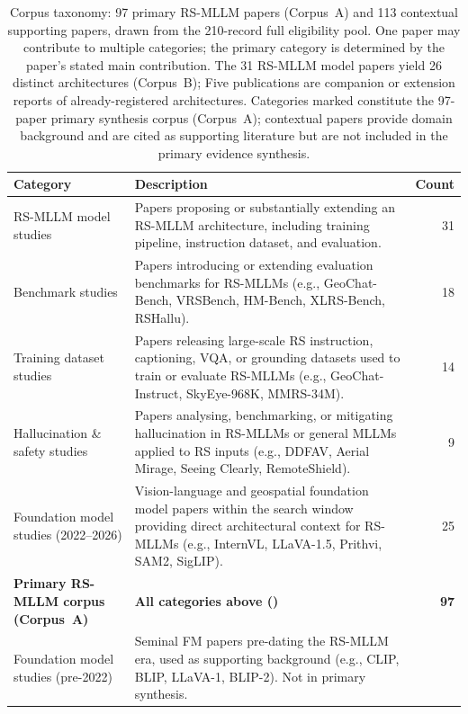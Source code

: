 \begin{table}[h]
\caption{Corpus taxonomy: 97 primary RS-MLLM papers (Corpus~A) and 113 contextual
supporting papers, drawn from the 210-record full eligibility pool.
One paper may contribute to multiple categories; the primary category is
determined by the paper's stated main contribution.
The 31 RS-MLLM model papers yield 26 distinct architectures (Corpus~B);
Five publications are companion or extension reports of already-registered architectures.
Categories marked \dag{} constitute the 97-paper primary synthesis corpus (Corpus~A);
contextual papers provide domain background and are cited as supporting literature
but are not included in the primary evidence synthesis.}\label{tab:corpus_taxonomy}
\small\setlength\tabcolsep{4pt}
\begin{tabular*}{\textwidth}{@{\extracolsep\fill}p{3.8cm}p{6.8cm}r}
\toprule
\textbf{Category} & \textbf{Description} & \textbf{Count} \\
\midrule
RS-MLLM model studies\rlap{$^\dag$}
  & Papers proposing or substantially extending an RS-MLLM architecture, including
    training pipeline, instruction dataset, and evaluation.
  & 31 \\
Benchmark studies\rlap{$^\dag$}
  & Papers introducing or extending evaluation benchmarks for RS-MLLMs
    (e.g., GeoChat-Bench, VRSBench, HM-Bench, XLRS-Bench, RSHallu).
  & 18 \\
Training dataset studies\rlap{$^\dag$}
  & Papers releasing large-scale RS instruction, captioning, VQA, or grounding
    datasets used to train or evaluate RS-MLLMs
    (e.g., GeoChat-Instruct, SkyEye-968K, MMRS-34M).
  & 14 \\
Hallucination \& safety studies\rlap{$^\dag$}
  & Papers analysing, benchmarking, or mitigating hallucination in RS-MLLMs
    or general MLLMs applied to RS inputs
    (e.g., DDFAV, Aerial Mirage, Seeing Clearly, RemoteShield).
  & 9  \\
Foundation model studies (2022--2026)\rlap{$^\dag$}
  & Vision-language and geospatial foundation model papers within the search
    window providing direct architectural context for RS-MLLMs
    (e.g., InternVL, LLaVA-1.5, Prithvi, SAM2, SigLIP).
  & 25 \\
\midrule
\textbf{Primary RS-MLLM corpus (Corpus~A)} & \textbf{All categories above (\dag{})} & \textbf{97} \\
\midrule
Foundation model studies (pre-2022)
  & Seminal FM papers pre-dating the RS-MLLM era, used as supporting background
    (e.g., CLIP, BLIP, LLaVA-1, BLIP-2). Not in primary synthesis.

\end{tabular*}
\end{table}
